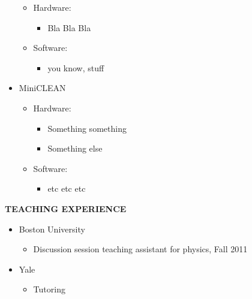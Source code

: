 \begin{singlespace}
\begin{itemize}
\begin{itemize}
  \item Hardware:
    \begin{itemize}
        
    \item Bla Bla Bla
        
    \end{itemize}
   \item Software:
      \begin{itemize}    
        \item you know, stuff
      \end{itemize}
 \end{itemize}     
\item MiniCLEAN
  \begin{itemize}
    \item Hardware:
      \begin{itemize}
        \item Something something
        \item Something else
      \end{itemize}
    \item Software:
      \begin{itemize}    
        \item etc etc etc 
      \end{itemize}
  \end{itemize}
\end{itemize}
 
\noindent
{\bf TEACHING EXPERIENCE}

\begin{itemize}
  
\item Boston University
  \begin{itemize}
    \item Discussion session teaching assistant for physics, Fall 2011
  \end{itemize}
\item Yale 
  \begin{itemize}
    \item Tutoring
  \end{itemize}
\end{itemize}

\begin{comment} 
\noindent
{\bf AFFILIATIONS}

\begin{itemize}

\item
   Something something
\item


\end{comment}
\end{singlespace}
